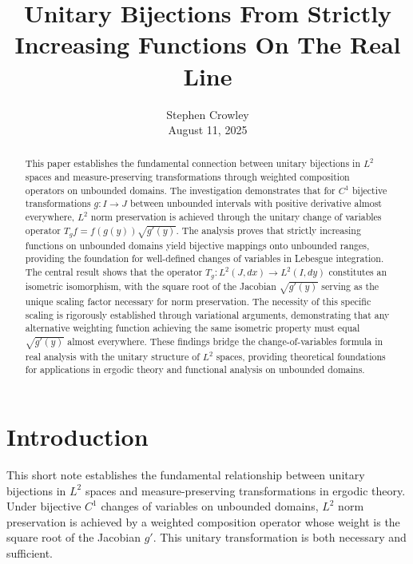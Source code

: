 \documentclass{article}
\newcommand{\tmaffiliation}[1]{\\ #1}
\begin{document}
{\cdot}\title{Unitary Bijections From Strictly Increasing Functions On The
Real Line}

\author{
  Stephen Crowley
  \tmaffiliation{August 11, 2025}
}

\maketitle

\begin{abstract}
  This paper establishes the fundamental connection between unitary bijections
  in $L^2$ spaces and measure-preserving transformations through weighted
  composition operators on unbounded domains. The investigation demonstrates
  that for $C^1$ bijective transformations $g : I \to J$ between unbounded
  intervals with positive derivative almost everywhere, $L^2$ norm
  preservation is achieved through the unitary change of variables operator
  $T_g f = f (g (y)) \sqrt{g' (y)}$. The analysis proves that strictly
  increasing functions on unbounded domains yield bijective mappings onto
  unbounded ranges, providing the foundation for well-defined changes of
  variables in Lebesgue integration. The central result shows that the
  operator $T_g : L^2 (J, dx) \to L^2 (I, dy)$ constitutes an isometric
  isomorphism, with the square root of the Jacobian $\sqrt{g' (y)}$ serving as
  the unique scaling factor necessary for norm preservation. The necessity of
  this specific scaling is rigorously established through variational
  arguments, demonstrating that any alternative weighting function achieving
  the same isometric property must equal $\sqrt{g' (y)}$ almost everywhere.
  These findings bridge the change-of-variables formula in real analysis with
  the unitary structure of $L^2$ spaces, providing theoretical foundations for
  applications in ergodic theory and functional analysis on unbounded domains.
\end{abstract}

{\tableofcontents}

\section{Introduction}

This short note establishes the fundamental relationship between unitary
bijections in $L^2$ spaces and measure-preserving transformations in ergodic
theory. Under bijective $C^1$ changes of variables on unbounded domains, $L^2$
norm preservation is achieved by a weighted composition operator whose weight
is the square root of the Jacobian $g'$. This unitary transformation is both
necessary and sufficient.
\end{document}
